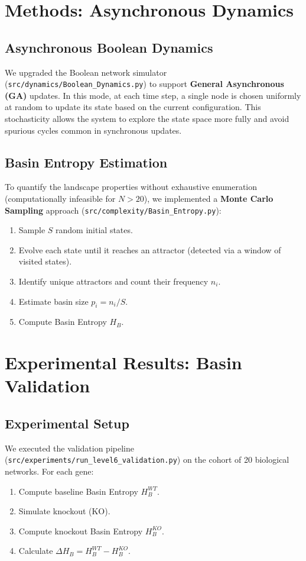 \documentclass{article}
\begin{document}
\section{Methods: Asynchronous Dynamics}

\subsection{Asynchronous Boolean Dynamics}
We upgraded the Boolean network simulator (\texttt{src/dynamics/Boolean\_Dynamics.py}) to support \textbf{General Asynchronous (GA)} updates. In this mode, at each time step, a single node is chosen uniformly at random to update its state based on the current configuration. This stochasticity allows the system to explore the state space more fully and avoid spurious cycles common in synchronous updates.

\subsection{Basin Entropy Estimation}
To quantify the landscape properties without exhaustive enumeration (computationally infeasible for $N > 20$), we implemented a \textbf{Monte Carlo Sampling} approach (\texttt{src/complexity/Basin\_Entropy.py}):
\begin{enumerate}
    \item Sample $S$ random initial states.
    \item Evolve each state until it reaches an attractor (detected via a window of visited states).
    \item Identify unique attractors and count their frequency $n_i$.
    \item Estimate basin size $p_i = n_i / S$.
    \item Compute Basin Entropy $H_B$.
\end{enumerate}

\section{Experimental Results: Basin Validation}

\subsection{Experimental Setup}
We executed the validation pipeline (\texttt{src/experiments/run\_level6\_validation.py}) on the cohort of 20 biological networks. For each gene:
\begin{enumerate}
    \item Compute baseline Basin Entropy $H_B^{WT}$.
    \item Simulate knockout (KO).
    \item Compute knockout Basin Entropy $H_B^{KO}$.
    \item Calculate $\Delta H_B = H_B^{WT} - H_B^{KO}$.
\end{enumerate}
\end{document}
